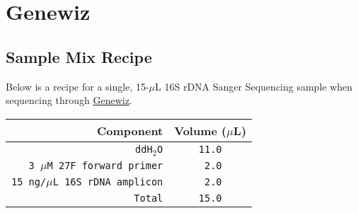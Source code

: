 \documentclass[twocolumn]{article}
\begin{document}
\section{Genewiz}\label{aB}
\subsection{Sample Mix Recipe}
Below is a recipe for a single,
15-$\mu$L 16S rDNA Sanger Sequencing sample when sequencing through \href{https://www.genewiz.com/}{Genewiz}.
\begin{table}[h]
  \begin{tabular}{|r|c|}
    \hline
    \textbf{Component} & \textbf{Volume ($\mu$L)} \\
    \hline
    \texttt{ddH$_2$O} & \texttt{11.0} \\
    \hline
    \texttt{3 $\mu$M 27F forward primer} & \texttt{ 2.0} \\
    \hline
    \texttt{15 ng\slash $\mu$L 16S rDNA amplicon} & \texttt{ 2.0} \\
    \hline
    \texttt{Total} & \texttt{15.0} \\
    \hline
  \end{tabular}
  \label{tab:SS_recp}
\end{table}



\end{document}
